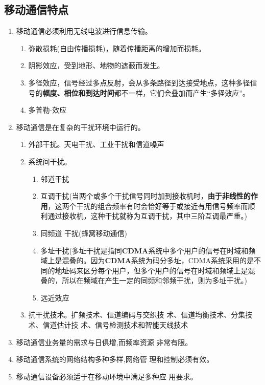 \documentclass[a4paper ]{report}
\begin{document}
	\subsection{移动通信特点}
	\begin{enumerate}
		\item 移动通信必须利用无线电波进行信息传输。
		\begin{enumerate}
			\item 弥散损耗(自由传播损耗)，随着传播距离的增加而损耗。
			\item 阴影效应，受到地形、地物的遮蔽而发生。
			\item 多径效应，信号经过多点反射，会从多条路径到达接受地点，这种多径信号的\textbf{幅度、相位和到达时间}都不一样，它们会叠加而产生“多径效应”。
			\item 多普勒-效应
		\end{enumerate}
		\item 移动通信是在复杂的干扰环境中运行的。
		\begin{enumerate}
			\item 外部干扰。天电干扰、工业干扰和信道噪声
			
			\item 系统间干扰。
			\begin{enumerate}
				\item 邻道干扰
				\item 互调干扰(当两个或多个干扰信号同时加到接收机时，\textbf{由于非线性的作用}，这两个干扰的组合频率有时会恰好等于或接近有用信号频率而顺利通过接收机，这种干扰就称为互调干扰，其中三阶互调最严重。)
				\item 同频道
				干扰(蜂窝移动通信)
				\item 多址干扰(多址干扰是指同\textbf{CDMA}系统中多个用户的信号在时域和频域上是混叠的。因为\textbf{CDMA}系统为码分多址，CDMA系统采用的是不同的地址码来区分每个用户，但多个用户的信号在时域和频域上是混叠的，所以在频域在产生一定的同频和邻频干扰，则为多址干扰。)
				\item 远近效应
			\end{enumerate}
			
			\item 抗干扰技术。扩频技术、信道编码与交织技
			术、信道均衡技术、分集技术、信道估计技
			术、信号检测技术和智能天线技术
			
		\end{enumerate}
		\item 移动通信业务量的需求与日俱增,而频率资源
		非常有限。
		\item 移动通信系统的网络结构多种多样,网络管
		理和控制必须有效。
		\item 移动通信设备必须适于在移动环境中满足多种应
		用要求。
	\end{enumerate}
\end{document}
